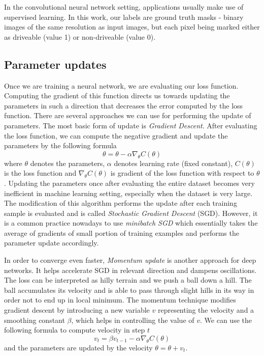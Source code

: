 In the convolutional neural network setting, applications usually make use of supervised
learning. In this work, our labels are ground truth masks - binary images of the same resolution
as input images, but each pixel being marked either as driveable (value 1) or non-driveable
(value 0).


\subsection{Parameter updates}
\label{sec:nn:parameter_updates}

Once we are training a neural network, we are evaluating our loss function.
Computing the gradient
of this function directs us towards updating the parameters in such a direction that
decreases the error computed by the loss function.
There are several approaches we can use for performing the update of parameters.
The most basic form of update is \textit{Gradient Descent}. After evaluating the loss function,
we can compute the negative gradient and update the parameters by the following formula
$$\theta = \theta - \alpha\nabla_{\theta} C(\theta)$$
where $\theta$ denotes the parameters, $\alpha$ denotes learning rate (fixed constant),
$C(\theta)$ is the loss function and $\nabla_{\theta} C(\theta)$ is gradient of the
loss function
with respect to $\theta$. Updating the parameters once after evaluating the entire dataset
becomes very inefficient in machine learning setting, especially when the dataset is very
large. The modification of this algorithm
performs the update after each training sample is evaluated and is called
\textit{Stochastic Gradient Descent} (SGD). However, it is a common practice nowadays to use
\textit{minibatch SGD} which essentially takes the average of gradients of small portion
of training examples and performs the parameter update accordingly.

In order to converge even faster, \textit{Momentum update} is another approach for
deep networks. It helps accelerate SGD in relevant direction and dampens oscillations.
The loss can be interpreted as hilly terrain and we push a ball down a hill. The ball
accumulates its velocity and is able to pass through slight hills in its way in order
not to end up in local minimum. The momentum technique modifies gradient descent
by introducing a new variable $v$ representing the velocity and a smoothing constant
$\beta$, which helps in controlling the value of $v$.
We can use the following formula to compute velocity in step $t$
$$v_t = \beta v_{t-1} - \alpha\nabla_{\theta} C(\theta)$$
and the parameters are updated by the velocity $\theta = \theta + v_t$.


